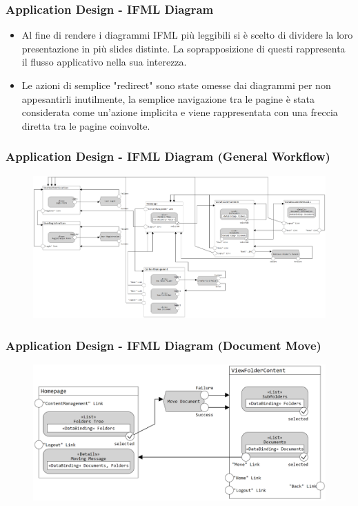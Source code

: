 \documentclass[aspectratio=169, dvipsnames]{beamer}
\begin{document}
\begin{frame}
    \frametitle{Application Design - IFML Diagram}
    \begin{itemize}
        \item Al fine di rendere i diagrammi IFML più leggibili si è scelto di dividere la loro presentazione in
              più slides distinte. La soprapposizione di questi rappresenta il flusso applicativo nella sua interezza.
        \item Le azioni di semplice "redirect" sono state omesse dai diagrammi per non appesantirli inutilmente,
              la semplice navigazione tra le pagine è stata considerata come un'azione implicita e viene rappresentata
              con una freccia diretta tra le pagine coinvolte.
    \end{itemize}
\end{frame}

\begin{frame}
    \frametitle{Application Design - IFML Diagram (General Workflow)}
    \begin{figure}
        \centering
        \includegraphics[width=1\linewidth]{Resources/IFMLs/images/IFML - Navigation.png}
    \end{figure}
\end{frame}

\begin{frame}
    \frametitle{Application Design - IFML Diagram (Document Move)}
    \begin{figure}
        \centering
        \includegraphics[width=0.9\linewidth]{Resources/IFMLs/images/IFML - Document Move.png}
    \end{figure}
\end{frame}
\end{document}
